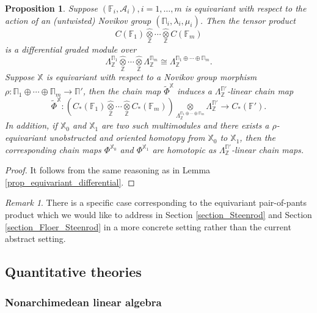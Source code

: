 \documentclass[reqno, 10pt]{amsart}
\numberwithin{equation}{section}
\numberwithin{equation}{section}
\newtheorem{prop}[thm]{Proposition}
\theoremstyle{definition}
\theoremstyle{remark}
\newtheorem{rem}[thm]{Remark}
\newcommand{\beqn}{\begin{equation*}}
\newcommand{\eeqn}{\end{equation*}}
\newcommand{\mb}{\mathbb}
\newcommand{\mc}{\mathcal}
\begin{document}
\begin{prop}\label{prop_Novikov_linear_chain_map}
Suppose $({\mb F}_i, {\mc A}_i), i = 1, \ldots, m$ is equivariant with respect to the action of an (untwisted) Novikov group $(\mb\Pi_i, \lambda_i, \mu_i)$. Then the tensor product 
\beqn
C ({\mb F}_1) \widehat{\underset{\mb Z}{\otimes}} \cdots \widehat{\underset{\mb Z}{\otimes}} C ({\mb F}_m)
\eeqn
is a differential graded module over 
\beqn
\Lambda_{\mb Z}^{\mb\Pi_1} \widehat{\underset{\mb Z}{\otimes}} \cdots \widehat{\underset{\mb Z}{\otimes}} \Lambda_{\mb Z}^{\mb\Pi_m} \cong \Lambda_{\mb Z}^{\mb\Pi_1 \oplus \cdots \oplus \mb\Pi_m}.
\eeqn 
Suppose ${\mb X}$ is equivariant with respect to a Novikov group morphism $\rho: \mb\Pi_1 \oplus \cdots \oplus \mb\Pi_m \to \mb\Pi'$, then the chain map $\tilde \Phi^{\mb X}$ induces a $\Lambda_{\mb Z}^{\mb\Pi'}$-linear chain map
\beqn
\tilde \Phi^{\mb X}: \left( C_*({\mb F}_1) \widehat{\underset{\mb Z}{\otimes} } \cdots \widehat{ \underset{\mb Z}{\otimes}} C_*({\mb F}_m) \right) \underset{\Lambda_{\mb Z}^{\mb\Pi_1\oplus \cdots \oplus \mb\Pi_m}}{\otimes} \Lambda_{\mb Z}^{\mb\Pi'} \to C_*({\mb F}').
\eeqn
In addition, if ${\mb X}_0$ and ${\mb X}_1$ are two such multimodules and there exists a $\rho$-equivariant unobstructed and oriented homotopy from ${\mb X}_0$ to ${\mb X}_1$, then the corresponding chain maps $\Phi^{{\mb X}_0}$ and $\Phi^{{\mb X}_1}$ are homotopic as $\Lambda_{\mb Z}^{{\mb\Pi}'}$-linear chain maps.
\end{prop}

\begin{proof}
It follows from the same reasoning as in Lemma \ref{prop_equivariant_differential}.   
\end{proof}


\begin{rem}
There is a specific case corresponding to the equivariant pair-of-pants product which we would like to address in Section \ref{section_Steenrod} and Section \ref{section_Floer_Steenrod} in a more concrete setting rather than the current abstract setting.
\end{rem}


\subsection{Quantitative theories}


\subsubsection{Nonarchimedean linear algebra}
\end{document}
